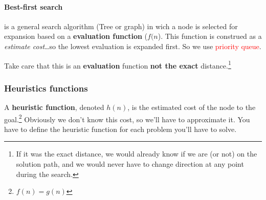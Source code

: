 \paragraph{Best-first search}

is a general search algorithm (Tree or graph) in wich a node is selected
for  expansion based  on  a \textbf{evaluation  function} ($f(n$).  This
function is  construed as a  \textit{estimate cost}\ldots so  the lowest
evaluation is expanded first. So we use \textcolor{red}{priority queue}.

Take care that  this is an \textbf{evaluation}  function \textbf{not the
exact} distance.\footnote{If it was the exact distance, we would already
know if we are (or not) on the solution path, and we would never have to
change direction at any point during the search.}

\subsubsection{Heuristics functions}

A \textbf{heuristic function}, denoted $h(n)$, is the estimated cost of the node to the goal.\footnote{$f(n)=g(n)$} Obviously we don't know this cost, so we'll have to approximate it. You have to define the heuristic function for each problem you'll have to solve. 

